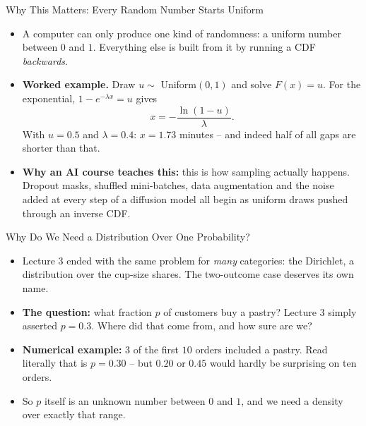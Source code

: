 \begin{frame}{Why This Matters: Every Random Number Starts Uniform}
\begin{itemize}
  \item A computer can only produce one kind of randomness: a uniform number between $0$ and $1$. Everything else is built from it by running a CDF \emph{backwards}.
  \pause
  \item \textbf{Worked example.} Draw $u \sim$ Uniform$(0,1)$ and solve $F(x) = u$. For the exponential, $1 - e^{-\lambda x} = u$ gives
  \[
    x = -\frac{\ln(1-u)}{\lambda} .
  \]
  With $u = 0.5$ and $\lambda = 0.4$: $x = 1.73$ minutes -- and indeed half of all gaps are shorter than that.
  \pause
  \item \textbf{Why an AI course teaches this:} this is how sampling actually happens. Dropout masks, shuffled mini-batches, data augmentation and the noise added at every step of a diffusion model all begin as uniform draws pushed through an inverse CDF.
\end{itemize}
\end{frame}

\begin{frame}{Why Do We Need a Distribution Over One Probability?}
\begin{itemize}
  \item Lecture 3 ended with the same problem for \emph{many} categories: the Dirichlet, a distribution over the cup-size shares. The two-outcome case deserves its own name.
  \pause
  \item \textbf{The question:} what fraction $p$ of customers buy a pastry? Lecture 3 simply asserted $p = 0.3$. Where did that come from, and how sure are we?
  \pause
  \item \textbf{Numerical example:} $3$ of the first $10$ orders included a pastry. Read literally that is $p = 0.30$ -- but $0.20$ or $0.45$ would hardly be surprising on ten orders.
  \pause
  \item So $p$ itself is an unknown number between $0$ and $1$, and we need a density over exactly that range.
\end{itemize}
\end{frame}

